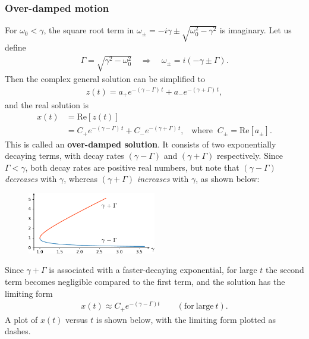 \documentclass[10pt,a4paper]{article}
\begin{document}
\subsubsection{Over-damped motion}
\label{overdamped}

For $\omega_0 < \gamma$, the square root term in $\omega_\pm =
-i\gamma \pm \sqrt{\omega_0^2 - \gamma^2}$ is imaginary.  Let us
define
\begin{align}
  \Gamma = \sqrt{\gamma^2 - \omega_0^2} \quad \Rightarrow \quad \omega_\pm = i \left(-\gamma \pm \Gamma\right).
\end{align}
Then the complex general solution can be simplified to
\begin{align}
  z(t) = a_+ e^{-\left(\gamma - \Gamma\right)\, t} + a_- e^{-\left(\gamma + \Gamma\right)\, t},
\end{align}
and the real solution is
\begin{align}
  x(t) &= \mathrm{Re}\left[z(t)\right] \\
  &= C_+ e^{-(\gamma - \Gamma) \,t} + C_- e^{-(\gamma + \Gamma) \, t},\;\;\;\mathrm{where}\;\; C_\pm = \mathrm{Re}[a_\pm].
\end{align}
This is called an \textbf{over-damped solution}.  It consists of two
exponentially decaying terms, with decay rates $(\gamma-\Gamma)$ and
$(\gamma + \Gamma)$ respectively. Since $\Gamma < \gamma$, both decay
rates are positive real numbers, but note that $(\gamma - \Gamma)$
\textit{decreases} with $\gamma$, whereas $(\gamma + \Gamma)$
\textit{increases} with $\gamma$, as shown below:

\begin{figure}[ht]
  \centering\includegraphics[width=0.5\textwidth]{decay_rates}
\end{figure}

Since $\gamma + \Gamma$ is associated with a faster-decaying
exponential, for large $t$ the second term becomes negligible compared
to the first term, and the solution has the limiting form
\begin{align}
  x(t) \approx C_+ e^{-(\gamma - \Gamma) t} \qquad (\mathrm{for}~\mathrm{large}~t).
\end{align}
A plot of $x(t)$ versus $t$ is shown below, with the limiting form
plotted as dashes.
\end{document}

